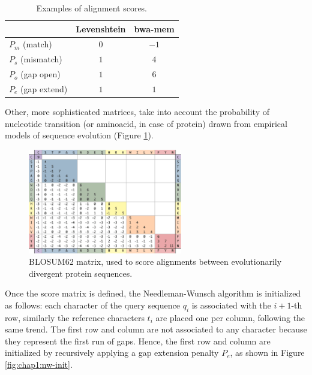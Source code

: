 \begin{table}[h]
\centering
\caption{Examples of alignment scores.}
\begin{tabular}{|l|c|c|}
   \hline
    & {\bf Levenshtein} & {\bf bwa-mem}\\
   \hline
	$P_m$ (match) & $0$ & $-1$\\ \hline
	$P_s$ (mismatch) & $1$ & $4$\\ \hline
	$P_o$ (gap open) & $1$ & $6$\\ \hline
	$P_e$ (gap extend) & $1$ & $1$\\ \hline
\end{tabular}
\label{tab:chap1:align-score}
\end{table}

Other, more sophisticated matrices, take into account the probability
of nucleotide transition (or aminoacid, in case of protein) drawn
from empirical models of sequence evolution (Figure
\ref{fig:chap1:blosum-matrix}).

\begin{figure}[h]
	\begin{minipage}[b]{\linewidth}
	  \centering
	  \includegraphics*[width=0.6\textwidth]{figures/chap1_blosum_matrix}
	  \caption{BLOSUM62 matrix, used to score alignments between
       evolutionarily divergent protein sequences.}
	  \label{fig:chap1:blosum-matrix}
   \end{minipage}
\end{figure}

Once the score matrix is defined, the Needleman-Wunsch algorithm
is initialized as follows: each character of the query sequence $q_i$ is
associated with the $i+1$-th row, similarly the reference characters
$t_i$ are placed one per column, following the same trend. The first row
and column are not associated to any character because they represent
the first run of gaps. Hence, the first row and column are
initialized by recursively applying a gap extension penalty $P_e$, as
shown in Figure \ref{fig:chap1:nw-init}.

